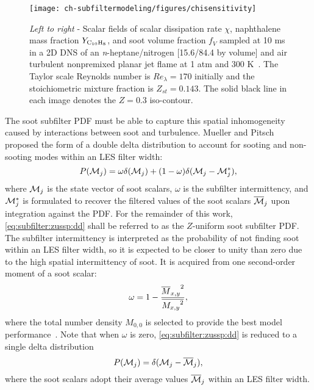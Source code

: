 \begin{figure}[htb]
  \centering
  \texttt{[image: ch-subfiltermodeling/figures/chisensitivity]}
  \caption[Spatial Variability of  and Soot Fields]{\textit{Left to right} - Scalar fields of scalar dissipation rate $\chi$, naphthalene mass fraction $Y_{\ce{C10H8}}$, and soot volume fraction $f_V$ sampled at 10 ms in a 2D DNS of an \textit{n}-heptane/nitrogen [15.6/84.4 by volume] and air turbulent nonpremixed planar jet flame at 1 atm and 300 K~\cite{bisetti2012}. The Taylor scale Reynolds number is $Re_{\lambda} = 170$ initially and the stoichiometric mixture fraction is $Z_{st} = 0.143$. The solid black line in each image denotes the $Z = 0.3$ iso-contour.} %
  \label{fig:subfilter:zussp:chisensitivity}
\end{figure}

The soot subfilter PDF must be able to capture this spatial inhomogeneity caused by interactions between soot and turbulence. Mueller and Pitsch~\cite{subfilterpdf2011} proposed the form of a double delta distribution to account for sooting and non-sooting modes within an LES filter width:
\begin{equation}\label{eq:subfilter:zussp:dd}
  P(\mathcal{M}_j) = \omega\delta(\mathcal{M}_j) + (1 - \omega)\delta(\mathcal{M}_j - \mathcal{M}_j^*),
\end{equation}
where $\mathcal{M}_j$ is the state vector of soot scalars, $\omega$ is the subfilter intermittency, and $\mathcal{M}_j^*$ is formulated to recover the filtered values of the soot scalars $\overline{\mathcal{M}}_j$ upon integration against the PDF. For the remainder of this work, \cref{eq:subfilter:zussp:dd} shall be referred to as the $Z$-uniform soot subfilter PDF. The subfilter intermittency is interpreted as the probability of not finding soot within an LES filter width, so it is expected to be closer to unity than zero due to the high spatial intermittency of soot. It is acquired from one second-order moment of a soot scalar:
\begin{equation}\label{eq:subfilter:zussp:omega}
  \omega = 1 - \frac{{\overline{M}_{x,y}}^2}{\overline{{M_{x,y}}^2}},
\end{equation}
where the total number density $M_{0,0}$ is selected to provide the best model performance~\cite{subfilterpdf2011}. Note that when $\omega$ is zero, \cref{eq:subfilter:zussp:dd} is reduced to a single delta distribution
\begin{equation}\label{eq:subfilter:zussp:sd}
  P(\mathcal{M}_j) = \delta(\mathcal{M}_j - \overline{\mathcal{M}}_j),
\end{equation}
where the soot scalars adopt their average values $\overline{\mathcal{M}}_j$ within an LES filter width.

